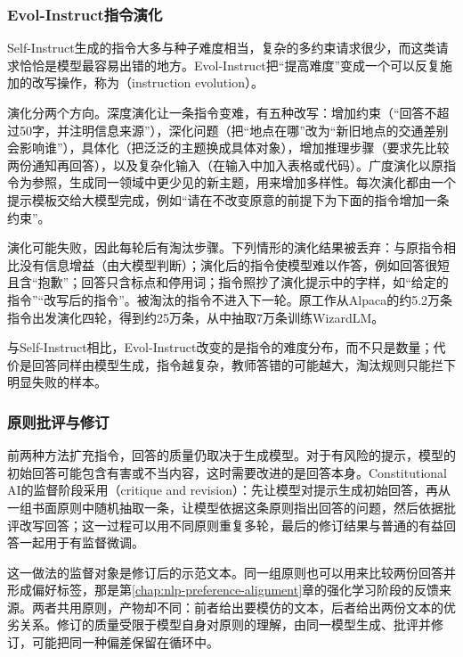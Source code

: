 \subsubsection{Evol-Instruct指令演化}
\label{sec:nlp-sft-evol-instruct}

Self-Instruct生成的指令大多与种子难度相当，复杂的多约束请求很少，而这类请求恰恰是模型最容易出错的地方。Evol-Instruct把“提高难度”变成一个可以反复施加的改写操作，称为（instruction evolution）。

演化分两个方向。深度演化让一条指令变难，有五种改写：增加约束（“回答不超过50字，并注明信息来源”），深化问题（把“地点在哪”改为“新旧地点的交通差别会影响谁”），具体化（把泛泛的主题换成具体对象），增加推理步骤（要求先比较两份通知再回答），以及复杂化输入（在输入中加入表格或代码）。广度演化以原指令为参照，生成同一领域中更少见的新主题，用来增加多样性。每次演化都由一个提示模板交给大模型完成，例如“请在不改变原意的前提下为下面的指令增加一条约束”。

演化可能失败，因此每轮后有淘汰步骤。下列情形的演化结果被丢弃：与原指令相比没有信息增益（由大模型判断）；演化后的指令使模型难以作答，例如回答很短且含“抱歉”；回答只含标点和停用词；指令照抄了演化提示中的字样，如“给定的指令”“改写后的指令”。被淘汰的指令不进入下一轮。原工作从Alpaca的约5.2万条指令出发演化四轮，得到约25万条，从中抽取7万条训练WizardLM。

与Self-Instruct相比，Evol-Instruct改变的是指令的难度分布，而不只是数量；代价是回答同样由模型生成，指令越复杂，教师答错的可能越大，淘汰规则只能拦下明显失败的样本。

\subsubsection{原则批评与修订}
\label{sec:nlp-sft-critique-revision}

前两种方法扩充指令，回答的质量仍取决于生成模型。对于有风险的提示，模型的初始回答可能包含有害或不当内容，这时需要改进的是回答本身。Constitutional AI的监督阶段采用（critique and revision）：先让模型对提示生成初始回答，再从一组书面原则中随机抽取一条，让模型依据这条原则指出回答的问题，然后依据批评改写回答；这一过程可以用不同原则重复多轮，最后的修订结果与普通的有益回答一起用于有监督微调。

这一做法的监督对象是修订后的示范文本。同一组原则也可以用来比较两份回答并形成偏好标签，那是第\ref{chap:nlp-preference-alignment}章的强化学习阶段的反馈来源。两者共用原则，产物却不同：前者给出要模仿的文本，后者给出两份文本的优劣关系。修订的质量受限于模型自身对原则的理解，由同一模型生成、批评并修订，可能把同一种偏差保留在循环中。

